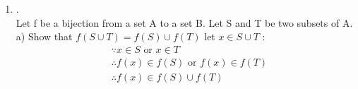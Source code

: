 \documentclass{article}
\theoremstyle{definition}
\theoremstyle{plain}
\providecommand{\floor}[1]{\left \lfloor #1 \right \rfloor }
\begin{document}
\begin {enumerate}[itemindent=30pt,label=\bf Exercise {\arabic*}:]
\begin{align*}
		&= 4a\\
	LHS &= RHS
\end{align*}
\subitem if $\dfrac{1}{4} \leqslant \varepsilon < \dfrac{2}{4}$ :
\begin{align*}
	LHS &= \floor{4\cdot(a + \varepsilon)} = 4a + 1\\
	RHS &= \floor{x + \varepsilon} + \floor{x + \varepsilon + \dfrac{1}{4}} + \floor{x + \varepsilon + \dfrac{2}{4}} + \floor{x + \varepsilon + \dfrac{3}{4}}\\
		&= a + a + a + (a + 1) \\
		&= 4a + 1\\
	LHS &= RHS
\end{align*}
\subitem if $\dfrac{2}{4} \leqslant \varepsilon < \dfrac{3}{4}$ :
\begin{align*}
	LHS &= \floor{4\cdot(a + \varepsilon)} = 4a + 2\\
	RHS &= \floor{x + \varepsilon} + \floor{x + \varepsilon + \dfrac{1}{4}} + \floor{x + \varepsilon + \dfrac{2}{4}} + \floor{x + \varepsilon + \dfrac{3}{4}}\\
		&= a + a + (a + 1) + (a + 1) \\
		&= 4a + 2\\
	LHS &= RHS
\end{align*}
\subitem if $\dfrac{3}{4} \leqslant \varepsilon < 1$ :
\begin{align*}
	LHS &= \floor{4\cdot(a + \varepsilon)} = 4a + 3\\
	RHS &= \floor{x + \varepsilon} + \floor{x + \varepsilon + \dfrac{1}{4}} + \floor{x + \varepsilon + \dfrac{2}{4}} + \floor{x + \varepsilon + \dfrac{3}{4}}\\
		&= a + (a + 1) + (a + 1) + (a + 1) \\
		&= 4a + 3\\
	LHS &= RHS
\end{align*}
\subitem Therefore, for any $x \in \mathbb{R}$,  $\floor{4x} = \floor{x} + \floor{x + \dfrac{1}{4}} + \floor{x + \dfrac{2}{4}} + \floor{x + \dfrac{3}{4}} $
\item .\\
Let f be a bijection from a set A to a set B. Let S and T be two subsets of A.
\subitem a) Show that $f(S \cup T) = f(S) \cup f(T)$
\subitem let  $x \in S \cup T$ : 
\begin{align*}	
	&\because x \in S \text{  or  } x \in T\\
	&\therefore f(x) \in f(S) \text{  or  } f(x) \in f(T)\\
	&\therefore f(x) \in f(S) \cup f(T)\\

\end{align*}
\end{enumerate}
\end{document}
